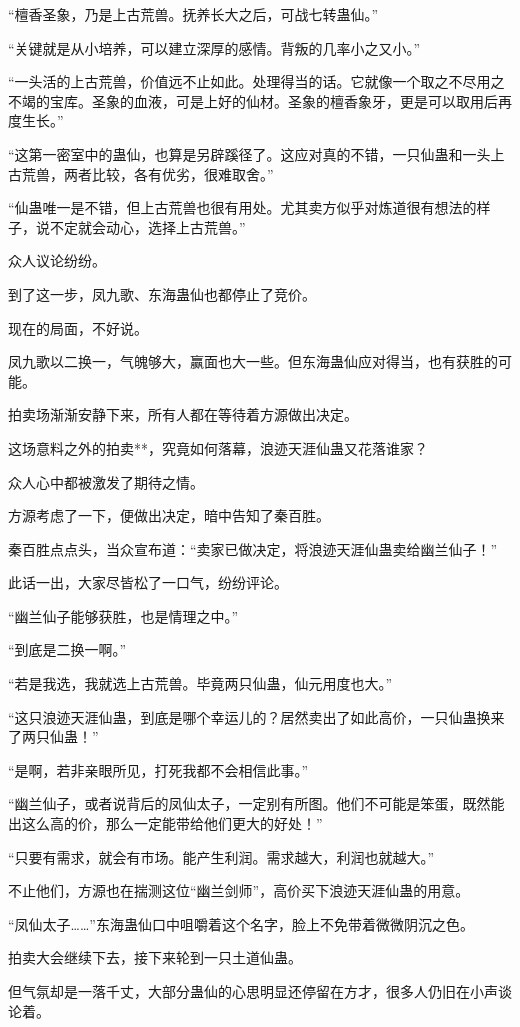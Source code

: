 \begin{this_body}
“檀香圣象，乃是上古荒兽。抚养长大之后，可战七转蛊仙。”

“关键就是从小培养，可以建立深厚的感情。背叛的几率小之又小。”

“一头活的上古荒兽，价值远不止如此。处理得当的话。它就像一个取之不尽用之不竭的宝库。圣象的血液，可是上好的仙材。圣象的檀香象牙，更是可以取用后再度生长。”

“这第一密室中的蛊仙，也算是另辟蹊径了。这应对真的不错，一只仙蛊和一头上古荒兽，两者比较，各有优劣，很难取舍。”

“仙蛊唯一是不错，但上古荒兽也很有用处。尤其卖方似乎对炼道很有想法的样子，说不定就会动心，选择上古荒兽。”

众人议论纷纷。

到了这一步，凤九歌、东海蛊仙也都停止了竞价。

现在的局面，不好说。

凤九歌以二换一，气魄够大，赢面也大一些。但东海蛊仙应对得当，也有获胜的可能。

拍卖场渐渐安静下来，所有人都在等待着方源做出决定。

这场意料之外的拍卖**，究竟如何落幕，浪迹天涯仙蛊又花落谁家？

众人心中都被激发了期待之情。

方源考虑了一下，便做出决定，暗中告知了秦百胜。

秦百胜点点头，当众宣布道：“卖家已做决定，将浪迹天涯仙蛊卖给幽兰仙子！”

此话一出，大家尽皆松了一口气，纷纷评论。

“幽兰仙子能够获胜，也是情理之中。”

“到底是二换一啊。”

“若是我选，我就选上古荒兽。毕竟两只仙蛊，仙元用度也大。”

“这只浪迹天涯仙蛊，到底是哪个幸运儿的？居然卖出了如此高价，一只仙蛊换来了两只仙蛊！”

“是啊，若非亲眼所见，打死我都不会相信此事。”

“幽兰仙子，或者说背后的凤仙太子，一定别有所图。他们不可能是笨蛋，既然能出这么高的价，那么一定能带给他们更大的好处！”

“只要有需求，就会有市场。能产生利润。需求越大，利润也就越大。”

不止他们，方源也在揣测这位“幽兰剑师”，高价买下浪迹天涯仙蛊的用意。

“凤仙太子……”东海蛊仙口中咀嚼着这个名字，脸上不免带着微微阴沉之色。

拍卖大会继续下去，接下来轮到一只土道仙蛊。

但气氛却是一落千丈，大部分蛊仙的心思明显还停留在方才，很多人仍旧在小声谈论着。


\end{this_body}
